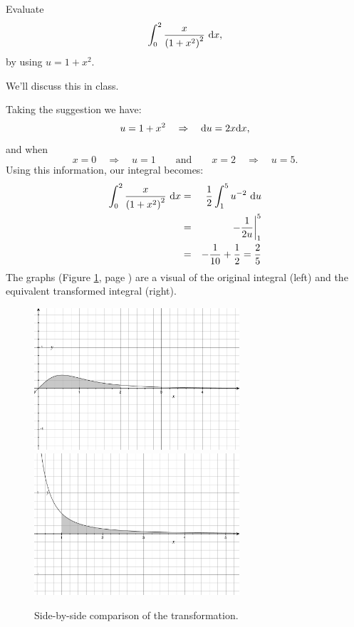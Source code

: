 \documentclass[12pt,addpoints, answers, fleqn]{exam}
\begin{document}
\begin{questions}
\question Evaluate
\[
\int_{0}^{2} \frac{x}{\left(1+x^2\right)^2} \ {\rm{d}} x,
\]
by using $u = 1+x^2$.

\begin{solution}
We'll discuss this in class.

Taking the suggestion we have:
\[
u = 1+x^2 \quad \Rightarrow \quad {\rm{d}} u = 2x{\rm{d}} x,
\]
and when
\[
x=0 \quad \Rightarrow \quad u = 1 \qquad \mbox{and}\qquad
x=2 \quad \Rightarrow \quad u = 5. 
\]
Using this information, our integral becomes:
\begin{eqnarray*}
\int_{0}^{2} \frac{x}{\left(1+x^2\right)^2} \ {\rm{d}} x &=& \frac{1}{2} \int_{1}^{5} u^{-2}  \ {\rm{d}} u\\
&=& \left. -\frac{1}{2u} \right|_1^5\\
&=& -\frac{1}{10} + \frac{1}{2} =\frac{2}{5}
\end{eqnarray*}
The graphs (Figure \ref{fig:graph3005}, page \pageref{fig:graph3005}) are a visual of the original integral (left) and the equivalent transformed integral (right). 
\end{solution}
\begin{figure}[htbp] %
   \centering
   \includegraphics[width=3in]{./graphics/graph3005.pdf}
   \includegraphics[width=3in]{./graphics/graph3006.pdf} 
   \caption{Side-by-side comparison of the transformation.}
   \label{fig:graph3005}
\end{figure}



\end{questions}
\end{document}
